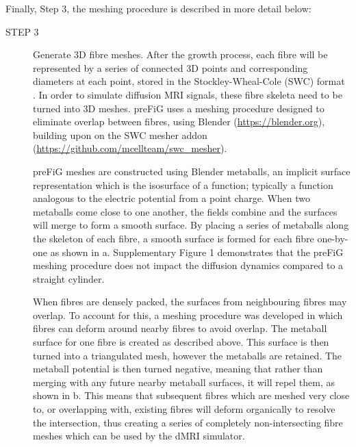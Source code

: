 Finally, Step 3, the meshing procedure is described in more detail below:
\begin{description}
  \item [STEP 3] Generate 3D fibre meshes. After the growth process, each fibre will be represented by a series of connected 3D points and corresponding diameters at each point, stored in the Stockley-Wheal-Cole (SWC) format \cite{Stockley1993}. In order to simulate diffusion MRI signals, these fibre skeleta need to be turned into 3D meshes. \ac{preFiG} uses a meshing procedure designed to eliminate overlap between fibres, using Blender (\url{https://blender.org}), building upon on the SWC mesher addon (\url{https://github.com/mcellteam/swc_mesher}).

\ac{preFiG} meshes are constructed using Blender metaballs, an implicit surface representation which is the isosurface of a function; typically a function analogous to the electric potential from a point charge. When two metaballs come close to one another, the fields combine and the surfaces will merge to form a smooth surface. By placing a series of metaballs along the skeleton of each fibre, a smooth surface is formed for each fibre one-by-one as shown in a. Supplementary Figure 1 demonstrates that the \ac{preFiG} meshing procedure does not impact the diffusion dynamics compared to a straight cylinder.

When fibres are densely packed, the surfaces from neighbouring fibres may overlap. To account for this, a meshing procedure was developed in which fibres can deform around nearby fibres to avoid overlap. The metaball surface for one fibre is created as described above. This surface is then turned into a triangulated mesh, however the metaballs are retained. The metaball potential is then turned negative, meaning that rather than merging with any future nearby metaball surfaces, it will repel them, as shown in b. This means that subsequent fibres which are meshed very close to, or overlapping with, existing fibres will deform organically to resolve the intersection, thus creating a series of completely non-intersecting fibre meshes which can be used by the dMRI simulator.

\end{description}


